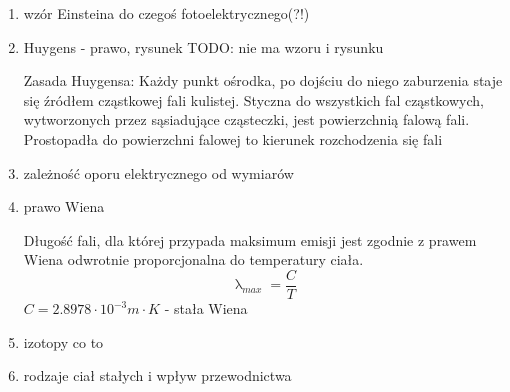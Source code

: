 \documentclass[12pt,a4paper]{article}
\begin{document}
\begin {enumerate}
\item wzór Einsteina do czegoś fotoelektrycznego(?!)

\item Huygens - prawo, rysunek TODO: nie ma wzoru i rysunku

Zasada Huygensa: Każdy punkt ośrodka, po dojściu do niego zaburzenia staje się źródłem cząstkowej fali kulistej. Styczna do wszystkich fal cząstkowych, wytworzonych przez sąsiadujące cząsteczki, jest powierzchnią falową fali. Prostopadła do powierzchni falowej to kierunek rozchodzenia się fali

\item zależność oporu elektrycznego od wymiarów

\item prawo Wiena

Długość fali, dla której przypada maksimum emisji jest zgodnie z prawem Wiena odwrotnie proporcjonalna do temperatury ciała.
$$\uplambda_{max}=\frac{C}{T}$$
$C = 2.8978\cdot 10^{-3} m\cdot K$ - stała Wiena

\item izotopy co to

\item rodzaje ciał stałych i wpływ przewodnictwa


\end {enumerate}
\end{document}
